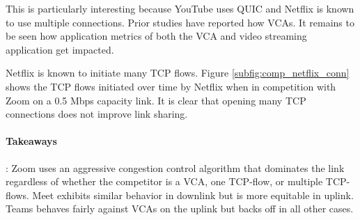 This is particularly interesting because YouTube uses QUIC and Netflix is known to use multiple connections. Prior studies have reported how VCAs. It remains to be seen how application metrics of both the VCA and video streaming application get impacted. 

Netflix is known to initiate many TCP flows. Figure \ref{subfig:comp_netflix_conn} shows the TCP flows initiated over time by Netflix when in competition with Zoom on a 0.5 Mbps capacity link. It is clear that opening many TCP connections does not improve link sharing.  

\begin{mdframed}[roundcorner=5pt, backgroundcolor=black!10]
\paragraph{Takeaways}: Zoom uses an aggressive congestion control algorithm that dominates the link regardless of whether the competitor is a VCA, one TCP-flow, or multiple TCP-flows. Meet exhibits similar behavior in downlink but is more equitable in uplink. Teams behaves fairly against VCAs on the uplink but backs off in all other cases. 
\end{mdframed}


